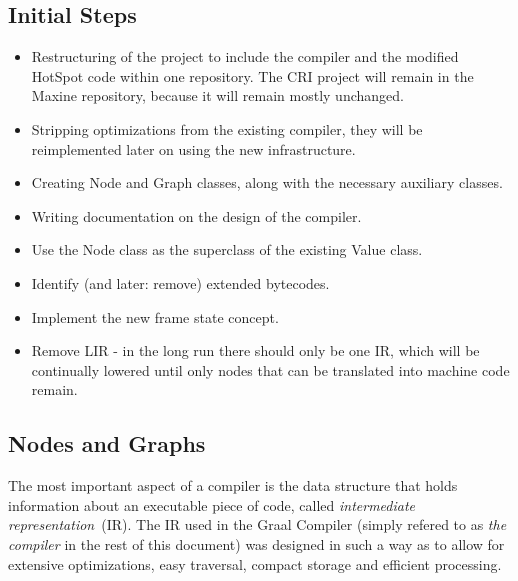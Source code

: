 \documentclass[twocolumn]{svjour3}
\begin{document}
\subsection{Initial Steps}
\begin{itemize}
    \item Restructuring of the project to include the compiler and the modified HotSpot code within one repository. The CRI project will remain in the Maxine repository, because it will remain mostly unchanged.
    \item Stripping optimizations from the existing compiler, they will be reimplemented later on using the new infrastructure.
    \item Creating Node and Graph classes, along with the necessary auxiliary classes.
    \item Writing documentation on the design of the compiler.
    \item Use the Node class as the superclass of the existing Value class.
    \item Identify (and later: remove) extended bytecodes.
    \item Implement the new frame state concept.
    \item Remove LIR - in the long run there should only be one IR, which will be continually lowered until only nodes that can be translated into machine code remain.
\end{itemize}

\subsection{Nodes and Graphs}
The most important aspect of a compiler is the data structure that holds information about an executable piece of code, called \emph{intermediate representation}~(IR).
The IR used in the Graal Compiler (simply refered to as \emph{the compiler} in the rest of this document) was designed in such a way as to allow for extensive optimizations, easy traversal, compact storage and efficient processing.
\end{document}
